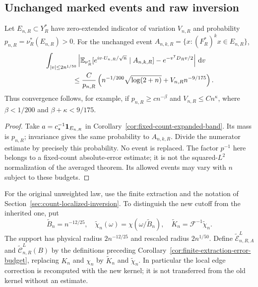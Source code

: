\subsection{Unchanged marked events and raw inversion}
\begin{corollary}
\label{cor:expanded-same-event-band}
Let $E_{n,R}\subset Y_R^*$ have zero-extended indicator of variation
$V_{n,R}$ and probability $p_{n,R}=\nu_R^*(E_{n,R})>0$.
For the unchanged event
$A_{n,k,R}=\{x:(F_R^*)^kx\in E_{n,R}\}$,
\begin{align}
 &\int_{|v|\le2n^{1/50}}
 \left|\mathbb E_{\nu_R^*}
 [e^{iv\cdot U_{n,R}/\sqrt n}\mid A_{n,k,R}]
                         -e^{-v^{\mathsf T}D_Rv/2}\right|\dd v\notag\\
 &\hspace{14mm}\le \frac{C}{p_{n,R}}
       \left(n^{-1/200}\sqrt{\log(2+n)}+V_{n,R}n^{-9/175}\right).
 \label{eq:expanded-same-event-band}
\end{align}
Thus convergence follows, for example, if
$p_{n,R}\ge c n^{-\beta}$ and $V_{n,R}\le Cn^\kappa$, where
$\beta<1/200$ and $\beta+\kappa<9/175$.
\end{corollary}
\begin{proof}
Take $a=c_*^{-1}\mathbf1_{E_{n,R}}$ in
Corollary~\ref{cor:fixed-count-expanded-band}. Its mass is $p_{n,R}$;
invariance gives the same probability to $A_{n,k,R}$. Divide the
numerator estimate by precisely this probability. No event is replaced.
The factor $p^{-1}$ here belongs to a fixed-count absolute-error
estimate; it is not the squared-$L^2$ normalization of the averaged
theorem. Its allowed events may vary with $n$ subject to these budgets.
\end{proof}

For the original unweighted law, use the finite extraction and the
notation of Section~\ref{sec:count-localized-inversion}. To distinguish
the new cutoff from the inherited one, put
\begin{equation}\label{eq:expanded-inversion-cutoff}
 \widetilde B_n=n^{-12/25},\quad
 \widetilde\chi_n(\omega)=\chi(\omega/\widetilde B_n),\quad
 \widetilde K_n=\mathcal F^{-1}\widetilde\chi_n.
\end{equation}
The support has physical radius $2n^{-12/25}$ and rescaled radius
$2n^{1/50}$. Define $\widetilde{\mathcal E}_{n,R,A}^{L}$ and
$\widetilde{\mathcal C}_{n,R}^{L}(B)$ by the definitions preceding
Corollary~\ref{cor:finite-extraction-error-budget}, replacing $K_n$
and $\chi_n$ by $\widetilde K_n$ and $\widetilde\chi_n$.
In particular the local edge correction is recomputed with the new
kernel; it is not transferred from the old kernel without an estimate.

